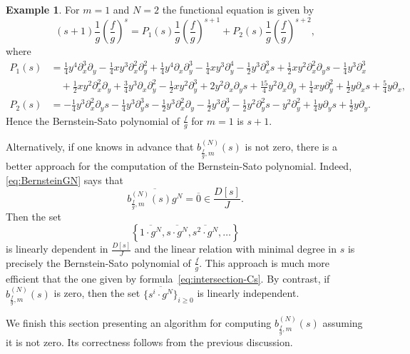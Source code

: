 \documentclass[a4paper,12pt]{amsart}
\theoremstyle{plain}
\theoremstyle{definition}
\newtheorem{ex}[theorem]{Example}
\theoremstyle{remark}
\begin{document}
\begin{ex}
For $m=1$ and $N=2$ the functional equation is given by
\[
(s+1) \frac{1}{g} \left( \frac{f}{g} \right)^s =
P_1(s) \frac{1}{g} \left( \frac{f}{g} \right)^{s+1} +
P_2(s) \frac{1}{g} \left( \frac{f}{g} \right)^{s+2},
\]
where
\[
\begin{aligned}
P_1(s) &= \frac{1}{4}y^4\partial_x^3\partial_y - \frac{1}{4}xy^3\partial_x^2\partial_y^2 + \frac{1}{4}y^4\partial_x\partial_y^3
- \frac{1}{4}xy^3\partial_y^4 - \frac{1}{2}y^3\partial_x^3s + \frac{1}{2}xy^2\partial_x^2\partial_ys - \frac{1}{4}y^3\partial_x^3 \\
& \quad + \frac{1}{2}xy^2\partial_x^2\partial_y + \frac{3}{4}y^3\partial_x\partial_y^2 - \frac{1}{2}xy^2\partial_y^3 + 2y^2\partial_x\partial_ys + \frac{15}{4}y^2\partial_x\partial_y + \frac{1}{4}xy\partial_y^2 + \frac{1}{2}y\partial_xs
+ \frac{5}{4}y\partial_x, \\[5pt]
P_2(s) &= -\frac{1}{4}y^3\partial_x^2\partial_ys - \frac{1}{4}y^3\partial_y^3s - \frac{1}{2}y^3\partial_x^2\partial_y - \frac{1}{2}y^3\partial_y^3 - \frac{1}{2}y^2\partial_y^2s - y^2\partial_y^2 + \frac{1}{4}y\partial_ys + \frac{1}{2} y\partial_y.
\end{aligned}
\]
Hence the Bernstein-Sato polynomial of $\frac{f}{g}$ for $m=1$ is $s+1$.
\end{ex}

Alternatively, if one knows in advance that $b_{\frac{f}{g},m}^{(N)}(s)$ is not zero, there is a better approach for the computation of the Bernstein-Sato polynomial. Indeed, \eqref{eq:BernsteinGN} says that
\[
\overline{b_{\frac{f}{g},m}^{(N)} (s) g^N} = \overline{0} \in \frac{D[s]}{J}.
\]
Then the set
\[
\left\{ \overline{1 \cdot g^N}, \overline{s \cdot g^N}, \overline{s^2 \cdot g^N}, \ldots \right\}
\]
is linearly dependent in $\frac{D[s]}{J}$ and the linear relation with minimal degree in $s$ is precisely the Bernstein-Sato polynomial of $\frac{f}{g}$.
This approach is much more efficient that the one given by formula~\eqref{eq:intersection-Cs}. By contrast,
if $b_{\frac{f}{g},m}^{(N)}(s)$ is zero, then the set $\big\{ \overline{s^i \cdot g^N} \big\}_{i \geq 0}$
is linearly independent.

We finish this section presenting an algorithm for computing $b_{\frac{f}{g},m}^{(N)}(s)$ assuming it is not zero.
Its correctness follows from the previous discussion.
\end{document}
